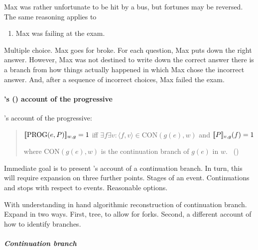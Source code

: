\begin{note}
  Max was rather unfortunate to be hit by a bus, but fortunes may be reversed.
  The same reasoning applies to

  \begin{enumerate}
  \item
    \label{prog:max:good}
    Max was failing at the exam.
  \end{enumerate}

  Multiple choice.
  Max goes for broke.
  For each question, Max puts down the right answer.
  However, Max was not destined to write down the correct answer there is a branch from how things actually happened in which Max chose the incorrect answer.
  And, after a sequence of incorrect choices, Max failed the exam.
\end{note}

\paragraph{\citeauthor{Landman:1992wh}'s (\citeyear{Landman:1992wh}) account of the progressive}

\begin{note}
  \citeauthor{Landman:1992wh}'s account of the progressive:

  \begin{quote}
    \(\sem{\text{PROG}(e, P)}_{w,g} = 1\) iff \(\exists f \exists v\colon \langle f,v \rangle \in \text{CON}(g(e), w)\)\newline
    \phantom{an} and \(\sem{P}_{v,g}(f) = 1\)\par

    where \(\text{CON}(g(e), w)\) is the continuation branch of \(g(e)\) in \(w\).\newline
    \mbox{ }\hfill\mbox{(\citeyear[27]{Landman:1992wh})}
  \end{quote}

  Immediate goal is to present \citeauthor{Landman:1992wh}'s account of a continuation branch.
  In turn, this will require expansion on three further points.
  Stages of an event.
  Continuations and stops with respect to events.
  Reasonable options.

  With understanding in hand algorithmic reconstruction of continuation branch.
  Expand in two ways.
  First, tree, to allow for forks.
  Second, a different account of how to identify branches.
\end{note}

\subparagraph{Continuation branch}

